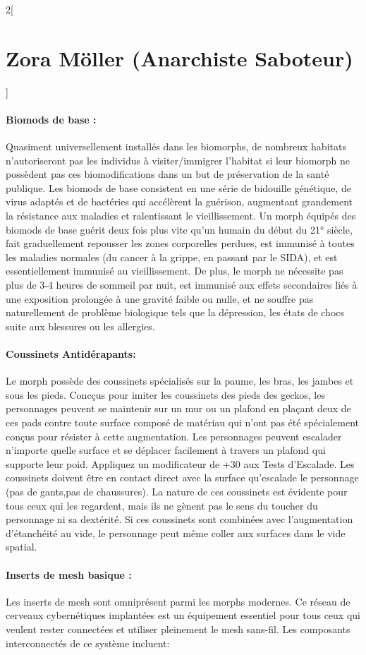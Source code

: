 \documentclass[a4paper,9pt]{article}
\begin{document}
\begin{multicols}{2}[\section*{Zora Möller (Anarchiste Saboteur)}]
   \paragraph{Biomods de base :} 
   Quasiment universellement  installés dans les biomorphs, de nombreux habitats
   n'autoriseront pas les individus à visiter/immigrer l'habitat si leur biomorph
   ne possèdent pas ces biomodifications dans un but de préservation de la santé
   publique. Les biomods de base consistent en une série de bidouille génétique,
   de virus adaptés et de bactéries qui accélèrent la guérison, augmentant
   grandement la résistance aux maladies et ralentissant le vieillissement. Un
   morph équipés des biomods de base guérit deux fois plus vite qu'un humain du
   début du 21° siècle, fait graduellement repousser les zones corporelles
   perdues, est immunisé à toutes les maladies normales (du cancer à la grippe, en
   passant par le SIDA), et est essentiellement immunisé au vieillissement. De
   plus, le morph ne nécessite pas plus de 3-4 heures de sommeil par nuit, est
   immunisé aux effets secondaires liés à une exposition prolongée à une gravité
   faible ou nulle, et ne souffre pas naturellement de problème biologique tels
   que la dépression, les états de chocs suite aux blessures ou les allergies.

   \paragraph{Coussinets Antidérapants:} Le morph possède des coussinets spécialisés
   sur la paume, les bras, les jambes et sous les pieds. Concçus pour imiter les
   coussinets des pieds des geckos, les personnages peuvent se maintenir sur un mur
   ou un plafond en plaçant deux de ces pads contre toute surface composé de
   matériau qui n'ont pas été spécialement conçus pour résister à cette
   augmentation. Les personnages peuvent escalader n'importe quelle surface et se
   déplacer facilement à travers un plafond qui supporte leur poid. Appliquez un
   modificateur de +30 aux Tests d'Escalade. Les coussinets doivent être en contact
   direct avec la surface qu'escalade le personnage (pas de gants,pas de
   chaussures). La nature de ces coussinets est évidente pour tous ceux qui les
   regardent, mais ils ne gènent pas le sens du toucher du personnage ni sa
   dextérité. Si ces coussinets sont combinées avec l'augmentation d'étanchéité au
   vide, le personnage peut même coller aux surfaces dans le vide spatial.

   \paragraph{Inserts de mesh basique :} 
   Les inserts de mesh sont omniprésent parmi les morphs modernes. Ce réseau de
   cerveaux cybernétiques implantées est un équipement essentiel pour tous ceux
   qui veulent rester connectées et utiliser pleinement le mesh sans-fil. Les
   composants interconnectés de ce système incluent: 


\end{multicols}
\end{document}
